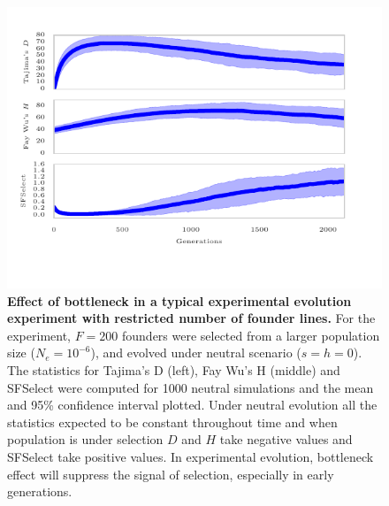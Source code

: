 \documentclass[11pt]{article}
\begin{document}
\begin{figure}[H]
	\centering 
	\includegraphics[trim=3.2in 0.1in 3.2in 0.2in , 
	clip,width=\textwidth]{figures/bottleneck}
	\caption{{\bf Effect of bottleneck in a typical experimental
            evolution experiment with restricted number of founder
            lines.} For the experiment, $F=200$ founders were selected
          from a larger population size ($N_e=10^{-6}$), and evolved
          under neutral scenario ($s=h=0$). The statistics for
          Tajima's D (left), Fay Wu's H (middle) and SFSelect were
          computed for 1000 neutral simulations and the mean and 95\%
          confidence interval plotted. Under neutral evolution all the 
          statistics expected to be constant throughout time and when 
          population is under selection $D$ and $H$ take negative values and 
          SFSelect take positive values. In experimental evolution, bottleneck 
          effect will suppress the signal of selection, especially in early 
          generations. }
	\label{fig:bottleneck}
\end{figure}
\end{document}

